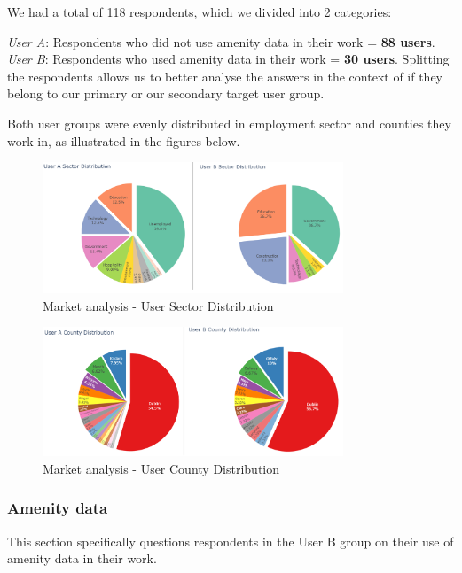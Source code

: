 We had a total of 118 respondents, which we divided into 2 categories:

\emph{User A}: Respondents who did not use amenity data in their work = \textbf{88 users}.
\emph{User B}: Respondents who used amenity data in their work = \textbf{30 users}.
Splitting the respondents allows us to better analyse the answers in the context of if they belong to our primary or our secondary target user group.

Both user groups were evenly distributed in employment sector and counties they work in, as illustrated in the figures below.

\begin{figure}[htbp]
    \centering{}{}
    \includegraphics[width=0.8\textwidth]{images/mr-sector-distribution.png}
    \caption{Market analysis - User Sector Distribution}
\end{figure}

\begin{figure}[htbp]
    \centering{}{}
    \includegraphics[width=0.8\textwidth]{images/mr-county-distribution.png}
    \caption{Market analysis - User County Distribution}
\end{figure}

\newpage{}

\subsubsection{Amenity data}
This section specifically questions respondents in the User B group on their use of amenity data in their work.

